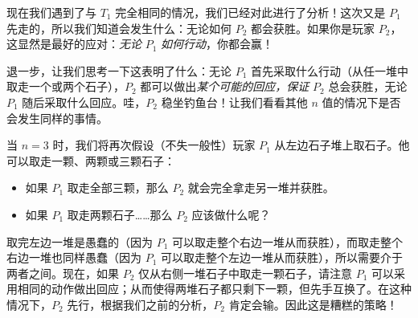 \begin{center}
\end{center}
现在我们遇到了与 $T_1$ 完全相同的情况，我们已经对此进行了分析！这次又是 $P_1$ 先走的，所以我们知道会发生什么：无论如何 $P_2$ 都会获胜。如果你是玩家 $P_2$，这显然是最好的应对：\textit{无论} $P_1$ \textit{如何行动}，你都会赢！

退一步，让我们思考一下这表明了什么：无论 $P_1$ 首先采取什么行动（从任一堆中取走一个或两个石子），$P_2$ 都可以做出\textit{某个可能的回应，保证} $P_2$ 总会获胜，无论 $P_1$ 随后采取什么回应。哇，$P_2$ 稳坐钓鱼台！让我们看看其他 $n$ 值的情况下是否会发生同样的事情。

当 $n = 3$ 时，我们将再次假设（不失一般性）玩家 $P_1$ 从左边石子堆上取石子。他可以取走一颗、两颗或三颗石子：

\begin{itemize}
    \item 如果 $P_1$ 取走全部三颗，那么 $P_2$ 就会完全拿走另一堆并获胜。
    \item 如果 $P_1$ 取走两颗石子……那么 $P_2$ 应该做什么呢？
\end{itemize}
取完左边一堆是愚蠢的（因为 $P_1$ 可以取走整个右边一堆从而获胜），而取走整个右边一堆也同样愚蠢（因为 $P_1$ 可以取走整个左边一堆从而获胜），所以需要介于两者之间。现在，如果 $P_2$ 仅从右侧一堆石子中取走一颗石子，请注意 $P_1$ 可以采用相同的动作做出回应；从而使得两堆石子都只剩下一颗，但先手互换了。在这种情况下，$P_2$ 先行，根据我们之前的分析，$P_2$ 肯定会输。因此这是糟糕的策略！

